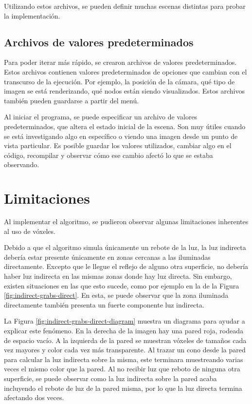 Utilizando estos archivos, se pueden definir muchas escenas distintas para probar la implementación.

\subsection{Archivos de valores predeterminados}

Para poder iterar más rápido, se crearon archivos de valores predeterminados.
Estos archivos contienen valores predeterminados de opciones que cambian con el transcurso de la ejecución.
Por ejemplo, la posición de la cámara, qué tipo de imagen se está renderizando, qué nodos están siendo visualizados.
Estos archivos también pueden guardarse a partir del menú.

Al iniciar el programa, se puede especificar un archivo de valores predeterminados, que altera el estado inicial de la escena.
Son muy útiles cuando se está investigando algo en específico o viendo una imagen desde un punto de vista particular.
Es posible guardar los valores utilizados, cambiar algo en el código, recompilar y observar cómo ese cambio afectó lo que se estaba observando.

\section{Limitaciones}

Al implementar el algoritmo, se pudieron observar algunas limitaciones inherentes al uso de vóxeles.

Debido a que el algoritmo simula únicamente un rebote de la luz, la luz indirecta debería estar presente únicamente en zonas cercanas a las iluminadas directamente.
Excepto que le llegue el reflejo de alguno otra superficie, no debería haber luz indirecta en las mismas zonas donde hay luz directa.
Sin embargo, existen situaciones en las que esto sucede, como por ejemplo en la de la Figura \ref{fig:indirect-grabs-direct}.
En esta, se puede observar que la zona iluminada directamente también presenta un fuerte componente luz indirecta.

La Figura \ref{fig:indirect-grabs-direct-diagram} muestra un diagrama para ayudar a explicar este fenómeno.
En la derecha de la imagen hay una pared roja, rodeada de espacio vacío.
A la izquierda de la pared se muestran vóxeles de tamaños cada vez mayores y color cada vez más transparente.
Al trazar un cono desde la pared para calcular la luz indirecta sobre la misma, este terminara muestreando varias veces el mismo color que la pared.
Al no recibir luz que reboto de ninguna otra superficie, se puede observar como la luz indirecta sobre la pared acaba incluyendo el rebote de luz de la pared misma, por lo que la luz directa termina afectando dos veces.

